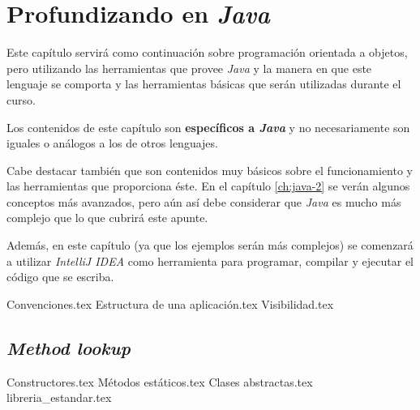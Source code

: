 \chapter{Profundizando en \textit{Java}}
  \label{ch:java}
  Este capítulo servirá como continuación sobre programación orientada a objetos, pero 
  utilizando las herramientas que provee \textit{Java} y la manera en que este lenguaje se
  comporta y las herramientas básicas que serán utilizadas durante el curso.

  Los contenidos de este capítulo son \textbf{específicos a \textit{Java}} y no 
  necesariamente son iguales o análogos a los de otros lenguajes.

  Cabe destacar también que son contenidos muy básicos sobre el funcionamiento y las 
  herramientas que proporciona éste.
  En el capítulo \ref{ch:java-2} se verán algunos conceptos más avanzados, pero aún así
  debe considerar que \textit{Java} es mucho más complejo que lo que cubrirá este apunte.

  Además, en este capítulo (ya que los ejemplos serán más complejos) se comenzará a 
  utilizar \textit{IntelliJ IDEA} como herramienta para programar, compilar y ejecutar 
  el código que se escriba.

  {Convenciones.tex}
  {Estructura de una aplicación.tex}
  {Visibilidad.tex}
  \section{\textit{Method lookup}}
    \label{sec:lookup}
  {Constructores.tex}
  {Métodos estáticos.tex}
  {Clases abstractas.tex}
  {libreria_estandar.tex}

  \nocite{*}
  \printbibliography[keyword=java-2]
%